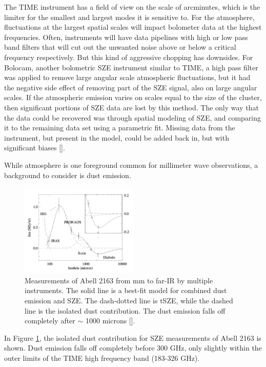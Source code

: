 \documentclass[manuscript]{aastex}
\begin{document}
The TIME instrument has a field of view on the scale of arcminutes, which is the limiter for the smallest and largest modes it is sensitive to. For the atmosphere, fluctuations at the largest spatial scales will impact bolometer data at the highest frequencies. Often, instruments will have data pipelines with high or low pass band filters that will cut out the unwanted noise above or below a critical frequency respectively. But this kind of aggressive chopping has downsides. For Bolocam, another bolometric SZE instrument similar to TIME, a high pass filter was applied to remove large angular scale atmospheric fluctuations, but it had the negative side effect of removing part of the SZE signal, also on large angular scales. If the atmospheric emission varies on scales equal to the size of the cluster, then significant portions of SZE data are lost by this method. The only way that the data could be recovered was through spatial modeling of SZE, and comparing it to the remaining data set using a parametric fit. Missing data from the instrument, but present in the model, could be added back in, but with significant biases [\cite{Sayers2013}].


While atmosphere is one foreground common for millimeter wave observations, a background to consider is dust emission.
\begin{figure}
\vspace{-0.8cm}
  \begin{center}
    \includegraphics[width=0.5\textwidth]{birkinshaw1.png}
   \end{center}
\caption[TIME's frequency window will be mostly free of dust emission contamination. -(\cite{Birkinshaw1999})]{Measurements of Abell 2163 from mm to far-IR by multiple instruments. The solid line is a best-fit model for combined dust emission and SZE. The dash-dotted line is tSZE, while the dashed line is the isolated dust contribution. The dust emission falls off completely after $\sim$ 1000 microns [\cite{Birkinshaw1999}].}
\label{fig:dust}
\end{figure}
In Figure \ref{fig:dust}, the isolated dust contribution for SZE measurements of Abell 2163 is shown. Dust emission falls off completely before 300 GHz, only slightly within the outer limits of the TIME high frequency band (183-326 GHz). 
\end{document}
